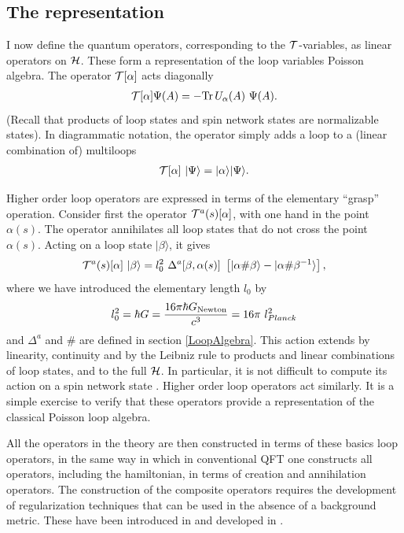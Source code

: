 \documentclass[12pt]{article}
\begin{document}
\subsection{The representation}

I now define the quantum operators, corresponding to the
$\cal T$-variables, as linear operators on $\cal H$. These
form a representation of the loop variables Poisson algebra.
The operator ${\cal T}[\alpha]$ acts diagonally 
\begin{eqnarray}
 {\cal T}[\alpha] \Psi(A)  = - \mathrm{Tr}\, U_{\alpha}(A)\ \Psi(A).
\end{eqnarray} 
(Recall that products of loop states and spin network states are
normalizable states). In diagrammatic notation, the operator 
simply adds a loop to a (linear combination of) multiloops
\begin{eqnarray}
 {\cal T}[\alpha]\ |\Psi\rangle  = |\alpha\rangle |\Psi\rangle. 
 \label{t00}
\end{eqnarray} 

Higher order loop operators are expressed in terms of the 
elementary ``grasp'' operation.  Consider first the operator 
${\cal T}^{a}(s)[\alpha]$, with one hand in the point 
$\alpha(s)$. The operator annihilates all loop states that do 
not cross the point $\alpha(s)$. Acting on a loop state 
$|\beta\rangle$, it gives
\begin{equation}
	{\cal T}^{a}(s)[\alpha]\ |\beta\rangle=
	 l^2_0 \ \Delta^a[\beta,\alpha(s)] \ 
     \left[ |\alpha\#\beta\rangle - |\alpha\#\beta^{-1}\rangle 
     \right],
\label{t11}
\end{equation}
where we have introduced the elementary length $l_0$ by
\begin{equation}
 l^2_0 = \hbar G = \frac{16 \pi \hbar G_{{\rm Newton}}}{c^3} 
 = 16 \pi\ l^2_{Planck}
\end{equation}
and $\Delta^a$ and $\#$ are defined in section \ref{LoopAlgebra}.  
This action extends by linearity, continuity and by the Leibniz 
rule to products and linear combinations of loop states, and to 
the full $\cal H$.  In particular, it is not difficult to compute 
its action on a spin network state \cite{DePietriRovelli}.  
Higher order loop operators act similarly.  It is a simple 
exercise to verify that these operators provide a representation 
of the classical Poisson loop algebra.

All the operators in the theory are then constructed in terms of 
these basics loop operators, in the same way in which in 
conventional QFT one constructs all operators, including the 
hamiltonian, in terms of creation and annihilation operators.  
The construction of the composite operators requires the 
development of regularization techniques that can be used in the 
absence of a background metric.  These have been introduced in 
\cite{Smolin93} and developed in 
\cite{RovelliSmolin95,DePietriRovelli,AshtekarEtAl95,%
weave,LewandowskiArea,AshtekarLewandowskiArea2}.  
\end{document}
